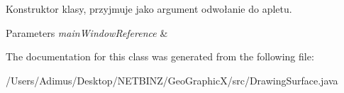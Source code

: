 Konstruktor klasy, przyjmuje jako argument odwołanie do apletu. 
\begin{DoxyParams}{Parameters}
{\em main\+Window\+Reference} & \\
\hline
\end{DoxyParams}


The documentation for this class was generated from the following file\+:\begin{DoxyCompactItemize}
\item 
/\+Users/\+Adimus/\+Desktop/\+N\+E\+T\+B\+I\+N\+Z/\+Geo\+Graphic\+X/src/Drawing\+Surface.\+java\end{DoxyCompactItemize}
